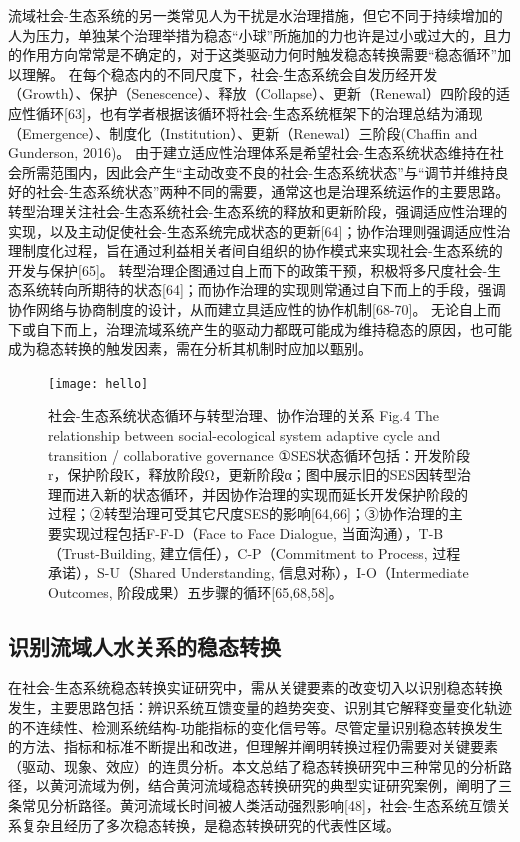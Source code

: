 流域社会-生态系统的另一类常见人为干扰是水治理措施，但它不同于持续增加的人为压力，单独某个治理举措为稳态“小球”所施加的力也许是过小或过大的，且力的作用方向常常是不确定的，对于这类驱动力何时触发稳态转换需要“稳态循环”加以理解。
在每个稳态内的不同尺度下，社会-生态系统会自发历经开发（Growth）、保护（Senescence）、释放（Collapse）、更新（Renewal）四阶段的适应性循环[63]，也有学者根据该循环将社会-生态系统框架下的治理总结为涌现（Emergence）、制度化（Institution）、更新（Renewal）三阶段(Chaffin and Gunderson, 2016)。
由于建立适应性治理体系是希望社会-生态系统状态维持在社会所需范围内，因此会产生“主动改变不良的社会-生态系统状态”与“调节并维持良好的社会-生态系统状态”两种不同的需要，通常这也是治理系统运作的主要思路。
转型治理关注社会-生态系统社会-生态系统的释放和更新阶段，强调适应性治理的实现，以及主动促使社会-生态系统完成状态的更新[64]；协作治理则强调适应性治理制度化过程，旨在通过利益相关者间自组织的协作模式来实现社会-生态系统的开发与保护[65]。
转型治理企图通过自上而下的政策干预，积极将多尺度社会-生态系统转向所期待的状态[64]；而协作治理的实现则常通过自下而上的手段，强调协作网络与协商制度的设计，从而建立具适应性的协作机制[68-70]。
无论自上而下或自下而上，治理流域系统产生的驱动力都既可能成为维持稳态的原因，也可能成为稳态转换的触发因素，需在分析其机制时应加以甄别。

\begin{figure}[htb] %
    \centering
    \texttt{[image: hello]}
    \caption[社会-生态系统状态循环]{社会-生态系统状态循环与转型治理、协作治理的关系
    Fig.4  The relationship between social-ecological system adaptive cycle and transition / collaborative governance
    ①SES状态循环包括：开发阶段r，保护阶段K，释放阶段Ω，更新阶段α；图中展示旧的SES因转型治理而进入新的状态循环，并因协作治理的实现而延长开发保护阶段的过程；②转型治理可受其它尺度SES的影响[64,66]；③协作治理的主要实现过程包括F-F-D（Face to Face Dialogue, 当面沟通），T-B（Trust-Building, 建立信任），C-P（Commitment to Process, 过程承诺），S-U（Shared Understanding, 信息对称），I-O（Intermediate Outcomes, 阶段成果）五步骤的循环[65,68,58]。}
    \label{fig:xfig0}
\end{figure}

\subsection{识别流域人水关系的稳态转换}

在社会-生态系统稳态转换实证研究中，需从关键要素的改变切入以识别稳态转换发生，主要思路包括：辨识系统互馈变量的趋势突变、识别其它解释变量变化轨迹的不连续性、检测系统结构-功能指标的变化信号等。尽管定量识别稳态转换发生的方法、指标和标准不断提出和改进，但理解并阐明转换过程仍需要对关键要素（驱动、现象、效应）的连贯分析。本文总结了稳态转换研究中三种常见的分析路径，以黄河流域为例，结合黄河流域稳态转换研究的典型实证研究案例，阐明了三条常见分析路径。黄河流域长时间被人类活动强烈影响[48]，社会-生态系统互馈关系复杂且经历了多次稳态转换，是稳态转换研究的代表性区域。

